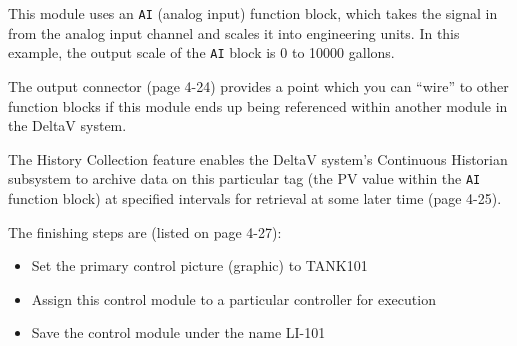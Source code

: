 







This module uses an {\tt AI} (analog input) function block, which takes the signal in from the analog input channel and scales it into engineering units.  In this example, the output scale of the {\tt AI} block is 0 to 10000 gallons.

\vskip 10pt

The output connector (page 4-24) provides a point which you can ``wire'' to other function blocks if this module ends up being referenced within another module in the DeltaV system.

\vskip 10pt

The History Collection feature enables the DeltaV system's Continuous Historian subsystem to archive data on this particular tag (the PV value within the {\tt AI} function block) at specified intervals for retrieval at some later time (page 4-25). 

\vskip 10pt

The finishing steps are (listed on page 4-27):

\begin{itemize}
\item{} Set the primary control picture (graphic) to TANK101
\item{} Assign this control module to a particular controller for execution
\item{} Save the control module under the name LI-101
\end{itemize}




